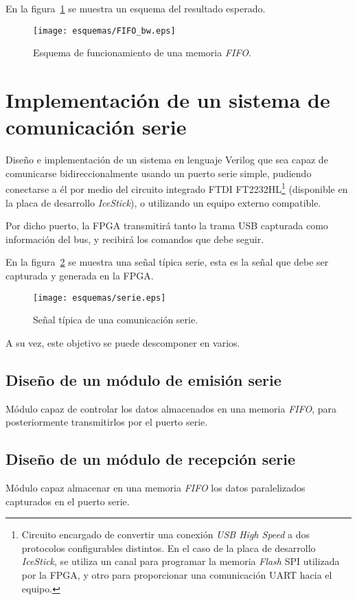 En la figura~\ref{fig:FIFO_info} se muestra un esquema del resultado esperado.

\begin{figure}[htb]
    \centering
    \texttt{[image: esquemas/FIFO\_bw.eps]}
    \caption{Esquema de funcionamiento de una memoria \emph{FIFO}.}
    \label{fig:FIFO_info}
\end{figure}



\section{Implementación de un sistema de comunicación serie}
Diseño e implementación de un sistema en lenguaje Verilog que sea capaz de comunicarse bidireccionalmente usando un puerto serie simple\cite{design-uart-vhdl}, pudiendo conectarse a él por medio del circuito integrado FTDI FT2232HL\footnote{Circuito encargado de convertir una conexión \emph{USB High Speed} a dos protocolos configurables distintos. En el caso de la placa de desarrollo \emph{IceStick}, se utiliza un canal para programar la memoria \emph{Flash} SPI utilizada por la FPGA, y otro para proporcionar una comunicación UART hacia el equipo.} (disponible en la placa de desarrollo \emph{IceStick}\cite{icestickmanual}), o utilizando un equipo externo compatible.

Por dicho puerto, la FPGA transmitirá tanto la trama USB capturada como información del bus, y recibirá los comandos que debe seguir.

En la figura~\ref{fig:serie_esquema} se muestra una señal típica serie, esta es la señal que debe ser capturada y generada en la FPGA.

\begin{figure}[htb]
    \centering
    \texttt{[image: esquemas/serie.eps]}
    \caption{Señal típica de una comunicación serie.}
    \label{fig:serie_esquema}
\end{figure}

A su vez, este objetivo se puede descomponer en varios.

\subsection{Diseño de un módulo de emisión serie}
Módulo capaz de controlar los datos almacenados en una memoria \emph{FIFO}, para posteriormente transmitirlos por el puerto serie.

\subsection{Diseño de un módulo de recepción serie}
Módulo capaz almacenar en una memoria \emph{FIFO} los datos paralelizados capturados en el puerto serie.



